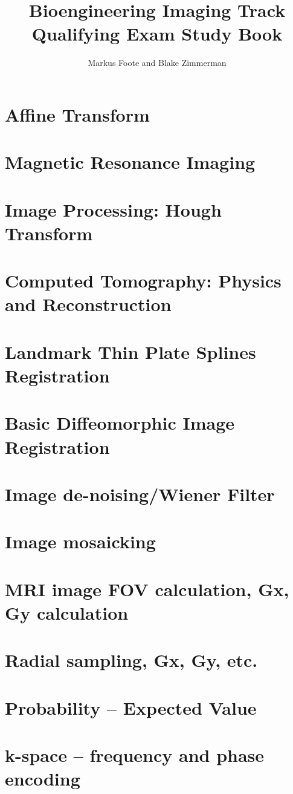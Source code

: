 \documentclass{report}
\title{Bioengineering Imaging Track Qualifying Exam Study Book}
\author{Markus Foote and Blake Zimmerman}
\begin{document}
	\maketitle
	\tableofcontents
	
	\chapter{Affine Transform}
	
	
	\chapter{Magnetic Resonance Imaging}
	
	
	\chapter{Image Processing: Hough Transform}
	
	
	\chapter{Computed Tomography: Physics and Reconstruction}
	
	
	\chapter{Landmark Thin Plate Splines Registration}
	\chapter{Basic Diffeomorphic Image Registration}
	
	\chapter{Image de-noising/Wiener Filter}
	
	\chapter{Image mosaicking}
	
	\chapter{MRI image FOV calculation, Gx, Gy calculation}
	
	\chapter{Radial sampling, Gx, Gy, etc.}
	
	\chapter{Probability – Expected Value}
	
	\chapter{k-space – frequency and phase encoding}
	
	
	
	
	
	
		
\end{document}
